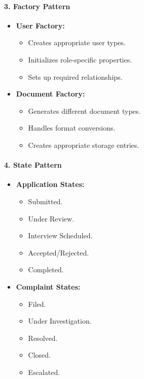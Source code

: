 \paragraph{3. Factory Pattern}
\begin{itemize}
    \item \textbf{User Factory:}
    \begin{itemize}
        \item Creates appropriate user types.
        \item Initializes role-specific properties.
        \item Sets up required relationships.
    \end{itemize}
    \item \textbf{Document Factory:}
    \begin{itemize}
        \item Generates different document types.
        \item Handles format conversions.
        \item Creates appropriate storage entries.
    \end{itemize}
\end{itemize}

\paragraph{4. State Pattern}
\begin{itemize}
    \item \textbf{Application States:}
    \begin{itemize}
        \item Submitted.
        \item Under Review.
        \item Interview Scheduled.
        \item Accepted/Rejected.
        \item Completed.
    \end{itemize}
    \item \textbf{Complaint States:}
    \begin{itemize}
        \item Filed.
        \item Under Investigation.
        \item Resolved.
        \item Closed.
        \item Escalated.
    \end{itemize}
\end{itemize}

